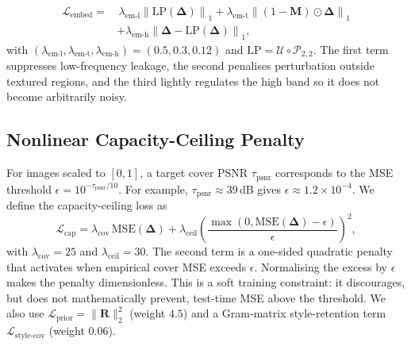 \documentclass[runningheads]{llncs}
\begin{document}
\begin{equation}
\begin{aligned}
    \mathcal{L}_{\text{embed}} = & \,\lambda_{\text{em-l}}\!\left\|\mathrm{LP}(\boldsymbol{\Delta})\right\|_1
    + \lambda_{\text{em-t}}\!\left\|(1-\mathbf{M})\odot\boldsymbol{\Delta}\right\|_1 \\
    & + \lambda_{\text{em-h}}\!\left\|\boldsymbol{\Delta}-\mathrm{LP}(\boldsymbol{\Delta})\right\|_1,
\end{aligned}
    \label{eq:embed}
\end{equation}
with $(\lambda_{\text{em-l}},\lambda_{\text{em-t}},\lambda_{\text{em-h}})=(0.5,0.3,0.12)$ and $\mathrm{LP}=\mathcal{U}\circ\mathcal{P}_{2,2}$. The first term suppresses low-frequency leakage, the second penalises perturbation outside textured regions, and the third lightly regulates the high band so it does not become arbitrarily noisy.

\subsection{Nonlinear Capacity-Ceiling Penalty}
\label{sec:ceil}
For images scaled to $[0,1]$, a target cover PSNR $\tau_{\text{psnr}}$ corresponds to the MSE threshold $\epsilon = 10^{-\tau_{\text{psnr}}/10}$. For example, $\tau_{\text{psnr}}\!\approx\!39$\,dB gives $\epsilon\!\approx\!1.2\!\times\!10^{-4}$. We define the capacity-ceiling loss as
\begin{equation}
    \mathcal{L}_{\text{cap}} = \lambda_{\text{cov}}\,\text{MSE}(\boldsymbol{\Delta}) + \lambda_{\text{ceil}} \left(\frac{\max\!\left(0,\text{MSE}(\boldsymbol{\Delta})-\epsilon\right)}{\epsilon}\right)^{\!2},
    \label{eq:cap}
\end{equation}
with $\lambda_{\text{cov}}\!=\!25$ and $\lambda_{\text{ceil}}\!=\!30$. The second term is a one-sided quadratic penalty that activates when empirical cover MSE exceeds $\epsilon$. Normalising the excess by $\epsilon$ makes the penalty dimensionless. This is a soft training constraint: it discourages, but does not mathematically prevent, test-time MSE above the threshold. We also use $\mathcal{L}_{\text{prior}}=\|\mathbf{R}\|_2^2$ (weight $4.5$) and a Gram-matrix style-retention term $\mathcal{L}_{\text{style-cov}}$ (weight $0.06$).
\end{document}
